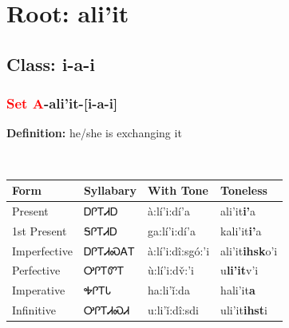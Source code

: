 \needspace{4in}
\section*{Root: ali'it}
\nopagebreak
{}
\needspace{3in}
\subsection*{Class: i-a-i}
\nopagebreak
\needspace{2in}
\subsubsection*{\textcolor{Red}{Set A}{-}\textbf{ali'it}{-}[i-a-i]}
\nopagebreak
\textbf{Definition: } he/she is exchanging it
\\[0.5em]
\begin{tabularx}{\textwidth}{l X X X}%
\toprule%
\textbf{Form}&\textbf{Syllabary}&\textbf{With Tone}&\textbf{Toneless}\\%
\midrule%
Present&ᎠᎵᎢᏗᎠ&à:lí’i:dí’a&ali'it\textbf{i'}a\\%
1st Present&ᎦᎵᎢᏗᎠ&ga:lí’i:dí’a&kali'it\textbf{i'}a\\%
Imperfective&ᎠᎵᎢᏗᏍᎪᎢ&à:lí’i:dî:sgó:’i&ali'it\textbf{ihsk}o'i\\%
Perfective&ᎤᎵᎢᏛᎢ&ù:lí’i:dv̌:’i&u\textbf{li'it}v'i\\%
Imperative&ᎭᎵᎢᏓ&ha:li’ǐ:da&hali'it\textbf{a}\\%
Infinitive&ᎤᎵᎢᏗᏍᏗ&u:li’ǐ:dî:sdi&uli'it\textbf{ihst}i\\%
\bottomrule%
\end{tabularx}
\\[1em]